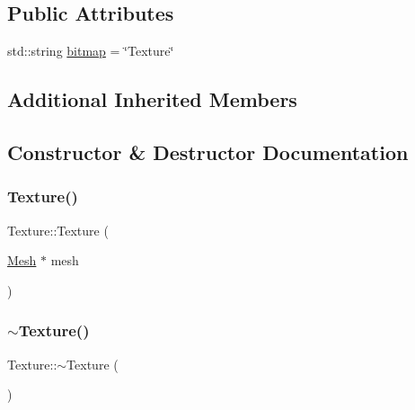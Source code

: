 \subsection*{Public Attributes}
\begin{DoxyCompactItemize}
\item 
std\+::string \mbox{\hyperlink{class_texture_a91a20f647be62bb66912167ce5e08ef6}{bitmap}} = \char`\"{}Texture\char`\"{}
\end{DoxyCompactItemize}
\subsection*{Additional Inherited Members}


\subsection{Constructor \& Destructor Documentation}
\mbox{\label{class_texture_a6d13acc5d63187bb129f28d29f9a794f}} 
\subsubsection{\texorpdfstring{Texture()}{Texture()}\hspace{0.1cm}{\footnotesize\ttfamily [1/2]}}
{\footnotesize\ttfamily Texture\+::\+Texture (\begin{DoxyParamCaption}\item[{\mbox{\hyperlink{class_mesh}{Mesh}} $\ast$}]{mesh }\end{DoxyParamCaption})}

\mbox{\label{class_texture_a09c4bcb7462f64c1d20fa69dba3cee8a}} 
\subsubsection{\texorpdfstring{$\sim$Texture()}{~Texture()}\hspace{0.1cm}{\footnotesize\ttfamily [1/2]}}
{\footnotesize\ttfamily Texture\+::$\sim$\+Texture (\begin{DoxyParamCaption}{ }\end{DoxyParamCaption})}

\mbox{\label{class_texture_a6c275e3f186675ff6ed73ccf970e552f}} 

